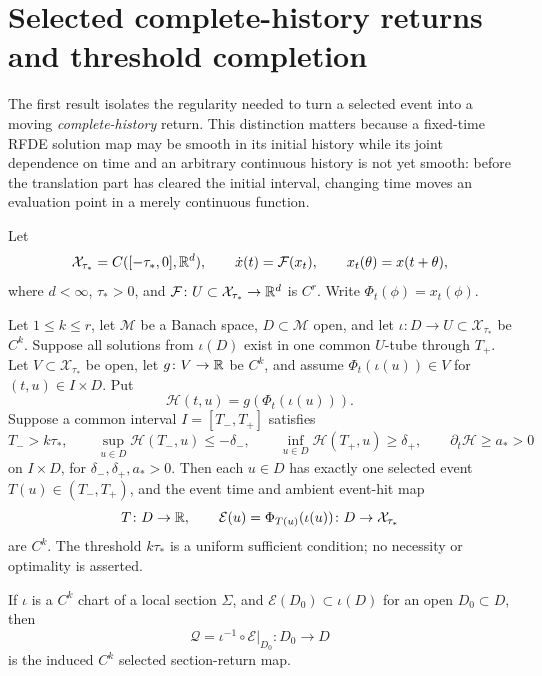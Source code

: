 \section{Selected complete-history returns and threshold completion}\label{sec:return-tools}
The first result isolates the regularity needed to turn a selected event into a moving
\emph{complete-history} return.  This distinction matters because a
fixed-time RFDE solution map may be smooth in its initial history while its
joint dependence on time and an arbitrary continuous history is not yet
smooth: before the translation part has cleared the initial interval,
changing time moves an evaluation point in a merely continuous function.

Let
\begin{equation}
 \mathcal X_{\tau_*}=C([-\tau_*,0],\mathbb R^d),\qquad
 \dot x(t)=\mathcal F(x_t),
 \qquad x_t(\theta)=x(t+\theta),                      \label{eq:general-rfde}
\end{equation}
where \(d<\infty\), \(\tau_*>0\), and
\(\mathcal F\colon U\subset\mathcal X_{\tau_*}\to\mathbb R^d\) is \(C^r\).
Write \(\Phi_t(\phi)=x_t(\phi)\).

\begin{theorem}
\label{thm:eventual-selected-return}
Let \(1\le k\le r\), let \(\mathcal M\) be a Banach space,
\(D\subset\mathcal M\) open, and let
\(\iota\colon D\to U\subset\mathcal X_{\tau_*}\) be \(C^k\).  Suppose all
solutions from \(\iota(D)\) exist in one common \(U\)-tube through \(T_+\).
Let \(V\subset\mathcal X_{\tau_*}\) be open, let
\(g\colon V\to\mathbb R\) be \(C^k\), and assume
\(\Phi_t(\iota(u))\in V\) for \((t,u)\in I\times D\).  Put
\[
 \mathcal H(t,u)=g(\Phi_t(\iota(u))).
\]
Suppose a common interval \(I=[T_-,T_+]\) satisfies
\begin{equation}
 T_->k\tau_*,\qquad
 \sup_{u\in D}\mathcal H(T_-,u)\le-\delta_-,\qquad
 \inf_{u\in D}\mathcal H(T_+,u)\ge\delta_+,
 \qquad
 \partial_t\mathcal H\ge a_*>0                     \label{eq:eventual-return-gates}
\end{equation}
on \(I\times D\), for \(\delta_-,\delta_+,a_*>0\).  Then each
\(u\in D\) has exactly one selected event
\(T(u)\in(T_-,T_+)\), and the event time and ambient event-hit map
\[
 T\colon D\to\mathbb R,
 \qquad \mathcal E(u)=\Phi_{T(u)}(\iota(u))
       \colon D\to\mathcal X_{\tau_*}
\]
are \(C^k\).  The threshold \(k\tau_*\) is a uniform sufficient condition;
no necessity or optimality is asserted.

If \(\iota\) is a \(C^k\) chart of a local section \(\Sigma\), and
\(\mathcal E(D_0)\subset\iota(D)\) for an open \(D_0\subset D\), then
\begin{equation}
 \mathcal Q=\iota^{-1}\circ\mathcal E\big|_{D_0}
 \colon D_0\to D                                      \label{eq:induced-selected-return}
\end{equation}
is the induced \(C^k\) selected section-return map.
\end{theorem}

